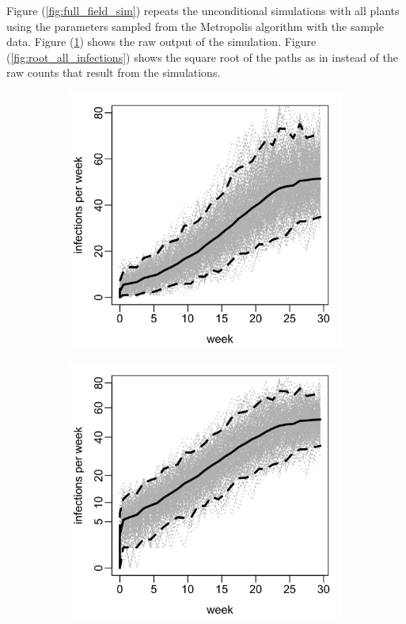 \documentclass{uwstat572}
\begin{document}
Figure (\ref{fig:full_field_sim}) repeats the unconditional simulations with all plants using the parameters sampled from the Metropolis algorithm with the sample data. 
Figure (\ref{fig:all_infections}) shows the raw output of the simulation. 
Figure (\ref{fig:root_all_infections}) shows the square root of the paths as in \citet{Brown} instead of the raw counts that result from the simulations.  
\begin{figure}[!b]
	\centering
	\begin{subfigure}[b]{0.49\textwidth}
		\includegraphics[width=\textwidth]{figures/figure_4b_all_plants.png}
		\caption{}
		\label{fig:all_infections}
	\end{subfigure}
	\hfill
	\begin{subfigure}[b]{0.49\textwidth}
		\includegraphics[width=\textwidth]{figures/figure_4b_all_plants_root.png}

\end{subfigure}
\end{figure}
\end{document}
